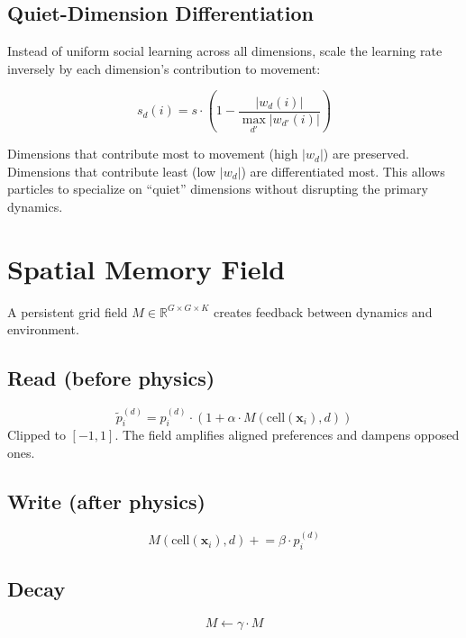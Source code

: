 \documentclass[11pt,a4paper]{article}
\begin{document}
\subsection{Quiet-Dimension Differentiation}

Instead of uniform social learning across all dimensions, scale the learning rate inversely by each dimension's contribution to movement:

\begin{equation}
s_d(i) = s \cdot \left(1 - \frac{|w_d(i)|}{\max_{d'} |w_{d'}(i)|}\right)
\end{equation}

Dimensions that contribute most to movement (high $|w_d|$) are preserved. Dimensions that contribute least (low $|w_d|$) are differentiated most. This allows particles to specialize on ``quiet'' dimensions without disrupting the primary dynamics.

\section{Spatial Memory Field}

A persistent grid field $M \in \mathbb{R}^{G \times G \times K}$ creates feedback between dynamics and environment.

\subsection{Read (before physics)}
\begin{equation}
\tilde{p}_i^{(d)} = p_i^{(d)} \cdot \left(1 + \alpha \cdot M\!\left(\mathrm{cell}(\mathbf{x}_i), d\right)\right)
\end{equation}
Clipped to $[-1, 1]$. The field amplifies aligned preferences and dampens opposed ones.

\subsection{Write (after physics)}
\begin{equation}
M\!\left(\mathrm{cell}(\mathbf{x}_i), d\right) \mathrel{+}= \beta \cdot p_i^{(d)}
\end{equation}

\subsection{Decay}
\begin{equation}
M \leftarrow \gamma \cdot M
\end{equation}
\end{document}
